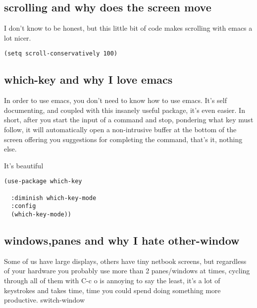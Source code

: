 \documentclass[12pt]{article}
\begin{document}
\subsection{scrolling and why does the screen move}
\label{sec:org83a0b6a}

I don’t know to be honest, but this little bit of code makes scrolling with emacs a lot nicer.
\begin{verbatim}
(setq scroll-conservatively 100)
\end{verbatim}

\subsection{which-key and why I love emacs}
\label{sec:orgc09a17c}

In order to use emacs, you don’t need to know how to use emacs. It’s self documenting, and coupled with this insanely useful package, it’s even easier. In short, after you start the input of a command and stop, pondering what key must follow, it will automatically open a non-intrusive buffer at the bottom of the screen offering you suggestions for completing the command, that’s it, nothing else.

It’s beautiful
\begin{verbatim}
(use-package which-key

  :diminish which-key-mode
  :config
  (which-key-mode))
\end{verbatim}

\subsection{windows,panes and why I hate other-window}
\label{sec:org201cad5}

Some of us have large displays, others have tiny netbook screens, but regardless of your hardware you probably use more than 2 panes/windows at times, cycling through all of them with C-c o is annoying to say the least, it’s a lot of keystrokes and takes time, time you could spend doing something more productive.
switch-window
\end{document}
